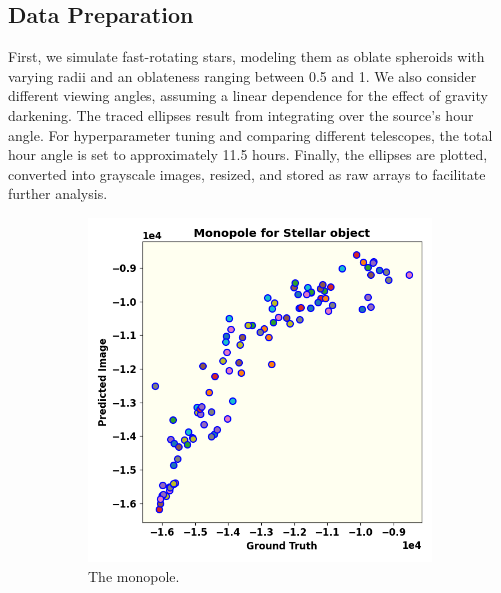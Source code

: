 \subsection{Data Preparation}
First, we simulate fast-rotating stars, modeling them as oblate spheroids with varying radii and an oblateness ranging between 0.5 and 1. We also consider different viewing angles, assuming a linear dependence for the effect of gravity darkening. The traced ellipses result from integrating over the source's hour angle. For hyperparameter tuning and comparing different telescopes, the total hour angle is set to approximately 11.5 hours. Finally, the ellipses are plotted, converted into grayscale images, resized, and stored as raw arrays to facilitate further analysis.
\begin{figure}
	\centering
	\begin{subfigure}{0.33\linewidth}
		\includegraphics[width=\linewidth]{fig/moments/mom0.png}
		\caption{The monopole.}
		\label{fig:mom1}
	\end{subfigure}\hfill
	\begin{subfigure}{0.33\linewidth}

\end{subfigure}
\end{figure}

